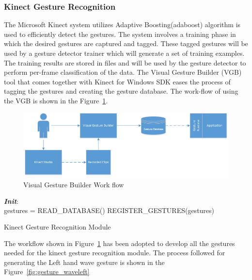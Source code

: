 \subsubsection{Kinect Gesture Recognition}
\label{sssec:kinect_gestures}
	The Microsoft Kinect system utilizes Adaptive Boosting(adaboost) algorithm \cite{freund1997decision} is used to efficiently detect the gestures. The system involves a training phase in which the desired gestures are captured and tagged. These tagged gestures will be used by a gesture detector trainer which will generate a set of training examples. The training results are stored in files and will be used by the gesture detector to perform per-frame classification of the data. The Visual Gesture Builder (VGB) tool that comes together with Kinect for Windows SDK eases the process of tagging the gestures and creating the gesture database. The work-flow of using the VGB is shown in the Figure~\ref{fig:vgb_workflow}.
\begin{figure}
\centering
\includegraphics[width=\textwidth]{assets/VisualGestureBuilder.png}
\caption[Visual Gesture Builder Work flow]{Visual Gesture Builder Work flow \cite{KinectSDK2014}}
\label{fig:vgb_workflow}
\end{figure}
\begin{algorithm}
 \textbf{\emph{Init}}:\\
 \quad gestures = READ\_DATABASE()\;
 \quad REGISTER\_GESTURES(gestures)\;
 \caption{Kinect Gesture Recognition Module}
 \label{alg:localize}
\end{algorithm}
The workflow shown in Figure~\ref{fig:vgb_workflow} has been adopted to develop all the gestures needed for the kinect gesture recognition module. The process followed for generating the Left hand wave gesture is shown in the Figure~\ref{fig:gesture_waveleft}
